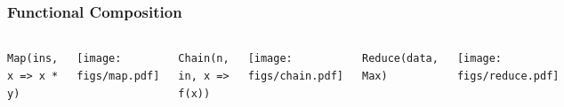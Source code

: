 \documentclass[xcolor=pdflatex,dvipsnames,table]{beamer}
\begin{document}
\begin{frame}
\frametitle{Functional Composition}


\begin{Large}
\begin{columns}

\verb+Map(ins, x => x * y)+ \\
\begin{center}
\texttt{[image: figs/map.pdf]} \\[2cm]
\end{center}

\verb+Chain(n, in, x => f(x))+ \\
\begin{center}
\texttt{[image: figs/chain.pdf]} \\
\end{center}

\verb+Reduce(data, Max)+ \\
\begin{center}
\texttt{[image: figs/reduce.pdf]} \\
\end{center}


\end{columns}

\end{Large}

\end{frame}
\end{document}
